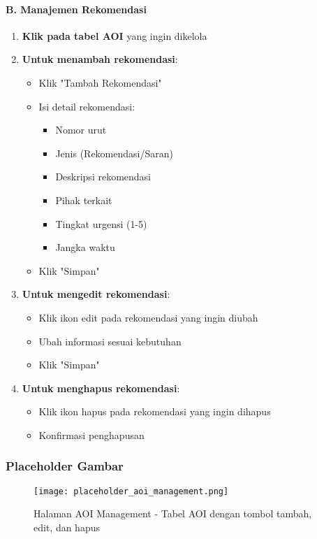 \documentclass[12pt,a4paper]{article}
\begin{document}
\paragraph{B. Manajemen Rekomendasi}
\begin{enumerate}
    \item \textbf{Klik pada tabel AOI} yang ingin dikelola
    \item \textbf{Untuk menambah rekomendasi}:
    \begin{itemize}
        \item Klik "Tambah Rekomendasi"
        \item Isi detail rekomendasi:
        \begin{itemize}
            \item Nomor urut
            \item Jenis (Rekomendasi/Saran)
            \item Deskripsi rekomendasi
            \item Pihak terkait
            \item Tingkat urgensi (1-5)
            \item Jangka waktu
        \end{itemize}
        \item Klik "Simpan"
    \end{itemize}
    \item \textbf{Untuk mengedit rekomendasi}:
    \begin{itemize}
        \item Klik ikon edit pada rekomendasi yang ingin diubah
        \item Ubah informasi sesuai kebutuhan
        \item Klik "Simpan"
    \end{itemize}
    \item \textbf{Untuk menghapus rekomendasi}:
    \begin{itemize}
        \item Klik ikon hapus pada rekomendasi yang ingin dihapus
        \item Konfirmasi penghapusan
    \end{itemize}
\end{enumerate}

\subsubsection{Placeholder Gambar}
\begin{figure}[H]
    \centering
    \texttt{[image: placeholder\_aoi\_management.png]}
    \caption{Halaman AOI Management - Tabel AOI dengan tombol tambah, edit, dan hapus}
    \label{fig:aoi_management}
\end{figure}
\end{document}
